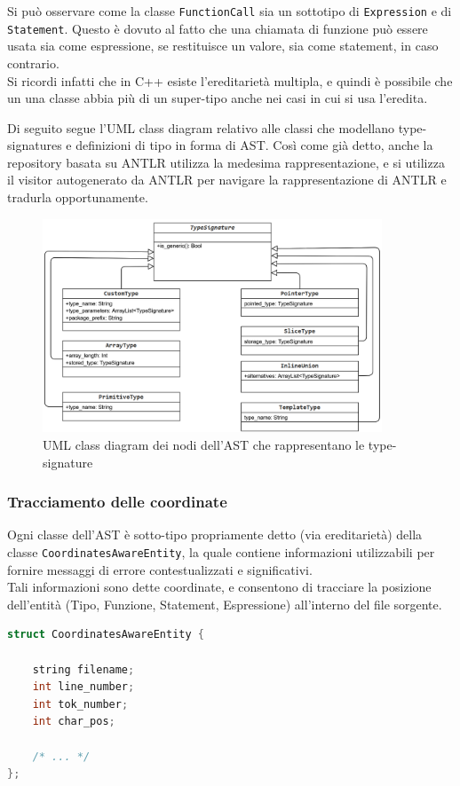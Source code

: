 Si può osservare come la classe \texttt{FunctionCall} sia un sottotipo di \texttt{Expression}
e di \texttt{Statement}. Questo è dovuto al fatto che una chiamata di funzione può essere
usata sia come espressione, se restituisce un valore, sia come statement, in caso contrario. \\

Si ricordi infatti che in C++ esiste l'ereditarietà multipla, e quindi è possibile che un
una classe abbia più di un super-tipo anche nei casi in cui si usa l'eredita.

\newpage

Di seguito segue l'UML class diagram relativo alle classi che modellano type-signatures e 
definizioni di tipo in forma di AST. Così come già detto, anche la repository
basata su ANTLR utilizza la medesima rappresentazione, e si utilizza il visitor
autogenerato da ANTLR per navigare la rappresentazione di ANTLR e tradurla opportunamente.

\begin{figure}[H]
    \centering
        \includegraphics[width=0.9\textwidth]{../../Assets/TypeSignatureAST.png}
    \caption{
        \centering
        UML class diagram dei nodi dell'AST che rappresentano le type-signature
    }
\end{figure}
\vspace{0.5cm}

\subsubsection{Tracciamento delle coordinate}
Ogni classe dell'AST è sotto-tipo propriamente detto (via ereditarietà) della classe \texttt{CoordinatesAwareEntity},
la quale contiene informazioni utilizzabili per fornire messaggi di errore contestualizzati e significativi. \\

Tali informazioni sono dette coordinate, e consentono di tracciare la posizione dell'entità 
(Tipo, Funzione, Statement, Espressione) all'interno del file sorgente. \\

\begin{lstlisting}[language=C++, frame=single]
struct CoordinatesAwareEntity {

    string filename;
    int line_number;
    int tok_number;
    int char_pos;

    /* ... */
};
\end{lstlisting}